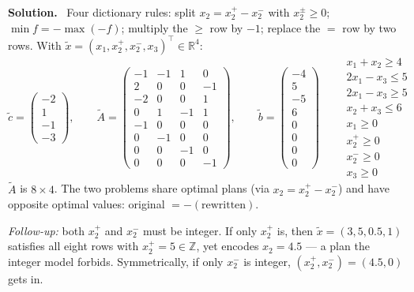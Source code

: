 \documentclass[10pt]{article}
\newenvironment{solution}
  {\par\smallskip\begingroup\color{solink}\textbf{Solution.}\ }
  {\endgroup\par}
\begin{document}
\begin{parts}
\begin{solution}
Four dictionary rules: split $x_2 = x_2^+ - x_2^-$ with $x_2^\pm \ge 0$; $\min f =
-\max(-f)$; multiply the $\ge$ row by $-1$; replace the $=$ row by two rows.
With $\tilde x = (x_1, x_2^+, x_2^-, x_3)^\top \in \mathbb{R}^4$:
\[
\tilde c = \begin{pmatrix} -2 \\ 1 \\ -1 \\ -3 \end{pmatrix}, \qquad
\tilde A = \begin{pmatrix}
  -1 & -1 & 1 & 0 \\
  2 & 0 & 0 & -1 \\
  -2 & 0 & 0 & 1 \\
  0 & 1 & -1 & 1 \\
  -1 & 0 & 0 & 0 \\
  0 & -1 & 0 & 0 \\
  0 & 0 & -1 & 0 \\
  0 & 0 & 0 & -1
\end{pmatrix}, \qquad
\tilde b = \begin{pmatrix} -4 \\ 5 \\ -5 \\ 6 \\ 0 \\ 0 \\ 0 \\ 0 \end{pmatrix}
\qquad
\begin{array}{l}
  \scriptstyle x_1 + x_2 \ge 4 \\ \scriptstyle 2x_1 - x_3 \le 5 \\ \scriptstyle 2x_1 - x_3 \ge 5 \\
  \scriptstyle x_2 + x_3 \le 6 \\ \scriptstyle x_1 \ge 0 \\ \scriptstyle x_2^+ \ge 0 \\
  \scriptstyle x_2^- \ge 0 \\ \scriptstyle x_3 \ge 0
\end{array}
\]
$\tilde A$ is $8 \times 4$. The two problems share optimal plans (via
$x_2 = x_2^+ - x_2^-$) and have opposite optimal values: original $= -(\text{rewritten})$.

\emph{Follow-up:} both $x_2^+$ and $x_2^-$ must be integer. If only $x_2^+$ is, then
$\tilde x = (3, 5, 0.5, 1)$ satisfies all eight rows with $x_2^+ = 5 \in \mathbb{Z}$,
yet encodes $x_2 = 4.5$ --- a plan the integer model forbids. Symmetrically, if only
$x_2^-$ is integer, $(x_2^+, x_2^-) = (4.5, 0)$ gets in.
\end{solution}


\end{parts}
\end{document}

